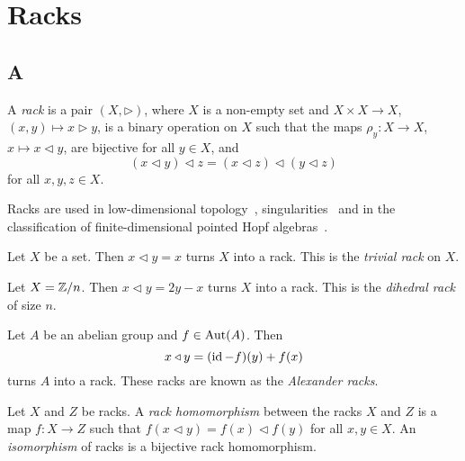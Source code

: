 \chapter{Racks}

\section*{{{\thesection}A}}

\begin{definition}
\label{defn:rack}
A \emph{rack} is a pair $(X,\triangleright)$, 
where $X$ is a non-empty set and 
$X\times X\to X$, $(x,y)\mapsto x\triangleright y$, is a binary operation on $X$ such that
the maps $\rho_y\colon X\to X$, $x\mapsto x\triangleleft y$, are bijective for all $y\in X$, and 
\begin{equation}
\label{eq:rack}
(x\triangleleft y)\triangleleft z=(x\triangleleft z)\triangleleft (y\triangleleft z)
\end{equation}
for all $x,y,z\in X$.
\end{definition}

Racks are used in low-dimensional topology~\cite{MR3379534}, singularities~\cite{MR975077} 
and in the classification of finite-dimensional pointed Hopf algebras~\cite{MR1994219}.

\begin{example}
    Let $X$ be a set. Then $x\triangleleft y=x$ turns $X$ into a rack. 
    This is the \emph{trivial rack} on $X$. 
\end{example}

\begin{example}
    Let $X=\mathbb{Z}/n$. Then $x\triangleleft y=2y-x$ turns $X$ into a rack. This is 
    the \emph{dihedral rack} of size $n$. 
\end{example}

\begin{example}
    Let $A$ be an abelian group and $f\in\operatorname{Aut}(A)$. Then 
    \[
    x\triangleleft y=(\operatorname{id}-f)(y)+f(x)
    \]
    turns $A$ into a rack. These racks 
    are known as the \emph{Alexander racks}.
\end{example}

\begin{definition}
    Let $X$ and $Z$ be racks. 
    A \emph{rack homomorphism} between the racks $X$ and $Z$ is a map $f\colon X\to Z$ such that 
    $f(x\triangleleft y)=f(x)\triangleleft f(y)$ for all $x,y\in X$. 
    An \emph{isomorphism} of racks is a bijective rack homomorphism. 
\end{definition}

